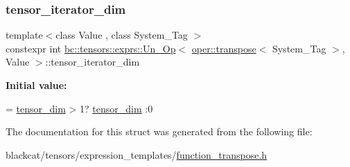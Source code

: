 \subsubsection{\texorpdfstring{tensor\+\_\+iterator\+\_\+dim}{tensor\_iterator\_dim}}
{\footnotesize\ttfamily template$<$class Value , class System\+\_\+\+Tag $>$ \\
constexpr int \hyperlink{structbc_1_1tensors_1_1exprs_1_1Un__Op}{bc\+::tensors\+::exprs\+::\+Un\+\_\+\+Op}$<$ \hyperlink{structbc_1_1oper_1_1transpose}{oper\+::transpose}$<$ System\+\_\+\+Tag $>$, Value $>$\+::tensor\+\_\+iterator\+\_\+dim\hspace{0.3cm}{\ttfamily [static]}}

{\bfseries Initial value\+:}
\begin{DoxyCode}
=
            \hyperlink{structbc_1_1tensors_1_1exprs_1_1Un__Op_3_01oper_1_1transpose_3_01System__Tag_01_4_00_01Value_01_4_afd4338e3d63a8fd0d6b4624cc3bf820b}{tensor\_dim} > 1? \hyperlink{structbc_1_1tensors_1_1exprs_1_1Un__Op_3_01oper_1_1transpose_3_01System__Tag_01_4_00_01Value_01_4_afd4338e3d63a8fd0d6b4624cc3bf820b}{tensor\_dim} :0
\end{DoxyCode}


The documentation for this struct was generated from the following file\+:\begin{DoxyCompactItemize}
\item 
blackcat/tensors/expression\+\_\+templates/\hyperlink{function__transpose_8h}{function\+\_\+transpose.\+h}\end{DoxyCompactItemize}
